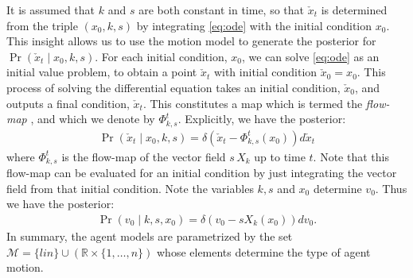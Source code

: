 \documentclass[letterpaper,10pt,conference]{ieeeconf}
\begin{document}
It is assumed that $k$ and $s$ are both constant in time, so that $\check{x}_t$ is determined from the triple $(x_0,k,s)$ by integrating \eqref{eq:ode} with the initial condition $x_0$.
This insight allows us to use the motion model to generate the posterior for $\Pr( \check{x}_t \mid x_0, k, s)$.
For each initial condition, $x_0$, we can solve \eqref{eq:ode} as an initial value problem, to obtain a point $\check{x}_t$ with initial condition $\check{x}_0 = x_0$.
This process of solving the differential equation takes an initial condition, $\check{x}_0$, and outputs a final condition, $\check{x}_t$.
This constitutes a map which is termed the \emph{flow-map} \cite[Ch 4]{MTA}, and which we denote by $\Phi_{k,s}^t$.
Explicitly, we have the posterior:
\begin{align}
	\Pr( \check{x}_t \mid x_0 , k , s) = \delta( \check{x}_t - \Phi^{t}_{k,s}( x_0) )  d\check{x}_t \label{eq:x_check | ksx}
\end{align}
where $\Phi^{t}_{k,s}$ is the flow-map of the vector field $s \,X_k$ up to time $t$.
Note that this flow-map can be evaluated for an initial condition by just integrating the vector field from that initial condition.
Note the variables $k,s$ and $x_0$ determine $v_0$.
Thus we have the posterior:
\begin{align}
	\Pr( v_0 \mid k, s, x_0) = \delta( v_0 -s X_k( x_0) ) dv_0. \label{eq:v | ksx}
\end{align}
In summary, the agent models are parametrized by the set $\mathcal{M} = \{ lin \} \cup \left( \mathbb{R} \times \{ 1 , \dots, n \} \right)$ whose elements determine the type of agent motion.
\end{document}
